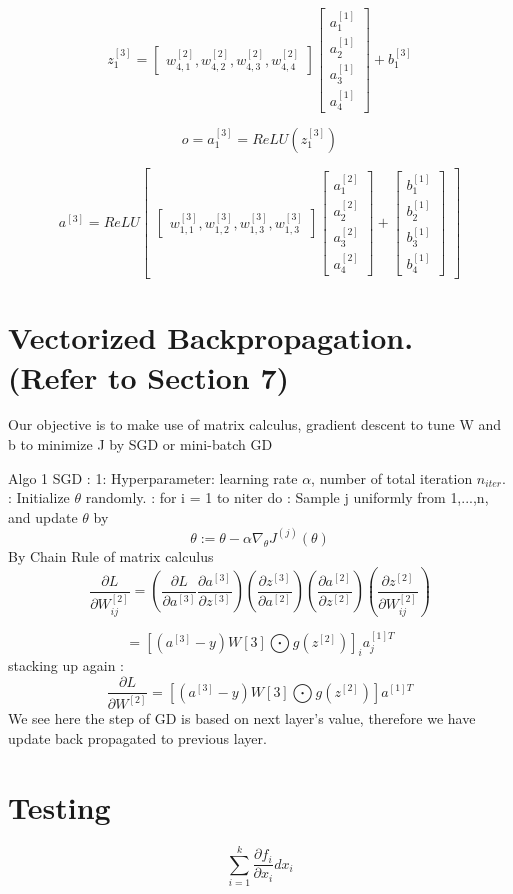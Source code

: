 \documentclass{article}
\begin{document}
\[
z_1^{[3]}=
\begin{bmatrix}
w_{4,1}^{[2]},w_{4,2}^{[2]},w_{4,3}^{[2]},w_{4,4}^{[2]}
\end{bmatrix}
\begin{bmatrix}
a_1^{[1]} \\ a_2^{[1]} \\ a_3^{[1]} \\ a_4^{[1]}
\end{bmatrix}
+ b_1^{[3]}
\]

\[ o = a_1^{[3]} = ReLU( z_1^{[3]}) \]

\[a^{[3]} = ReLU 
\begin{bmatrix}
\begin{bmatrix}
w_{1,1}^{[3]},w_{1,2}^{[3]},w_{1,3}^{[3]},w_{1,3}^{[3]}
\end{bmatrix}
\begin{bmatrix}
a_1^{[2]} \\ a_2^{[2]} \\ a_3^{[2]} \\ a_4^{[2]}
\end{bmatrix} +
\begin{bmatrix}
b_1^{[1]} \\ b_2^{[1]} \\ b_3^{[1]} \\ b_4^{[1]}
\end{bmatrix} 
\end{bmatrix}
\]




\section{Vectorized Backpropagation. (Refer to Section 7)}
Our objective is to make use of matrix calculus, gradient descent to tune W and b to minimize J by SGD or mini-batch GD \newline

Algo 1 SGD : 
 1: Hyperparameter: learning rate \(\alpha\), number of total iteration \(n_{iter}\). : Initialize \(\theta\) randomly. : for i = 1 to niter do : Sample j uniformly from {1,...,n}, and update \(\theta\) by \newline
\[ \theta := \theta - \alpha \nabla_\theta J^{(j)}(\theta) \] 
By Chain Rule of matrix calculus 
\[
\frac{\partial L }{\partial W_{ij}^{[2]}} = ( \frac{\partial L }{\partial a^{[3]}} \frac{\partial a^{[3]}}{\partial z^{[3]}} )
(\frac{\partial z^{[3]}}{\partial a^{[2]}}) ( \frac{\partial a^{[2]}}{\partial z^{[2]}})( \frac{\partial z^{[2]}}{\partial W_{ij}^{[2]}})
\]

\[
= [ (a^{[3]}-y)W[3] \bigodot g(z^{[2]}) ]_i a_j^{[1]T} 
\]
stacking up again :
\[
\frac{\partial L }{\partial W^{[2]}} = [ (a^{[3]}-y)W[3] \bigodot g(z^{[2]}) ] a^{[1]T} 
\]
We see here the step of GD is based on next layer's value, therefore we have update back propagated to previous layer.
\section{Testing}
\[
\sum_{i=1}^k \frac{\partial f_i}{\partial x_i} dx_i
\]
\end{document}
